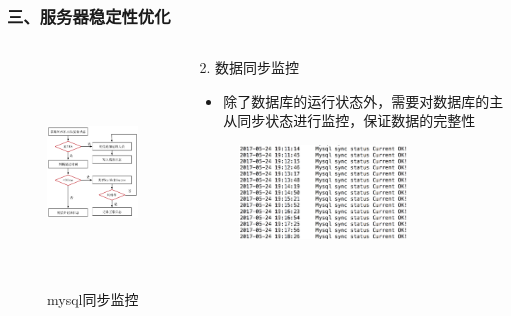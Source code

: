 \documentclass{beamer}
\begin{document}
\begin{frame}
\frametitle{三、服务器稳定性优化}
  \begin{columns}
    \begin{column}{0.60\textwidth}
      \begin{figure}
      \centering
        \includegraphics[height=6cm]{./img/mysql2.png}
        \caption{mysql同步监控}
        \label{fig:mysql2}
      \end{figure}
    \end{column}
    \begin{column}{0.40\textwidth}
      \begin{block}{2. 数据同步监控}
        \begin{itemize}
          \item \footnotesize{除了数据库的运行状态外，需要对数据库的主从同步状态进行监控，保证数据的完整性}
        \end{itemize}
      \end{block}
      \begin{figure}
      \centering
        \includegraphics[height=2.5cm]{./img/03/sql2.png}
      \end{figure}
    \end{column}
  \end{columns}
\end{frame}
\end{document}
